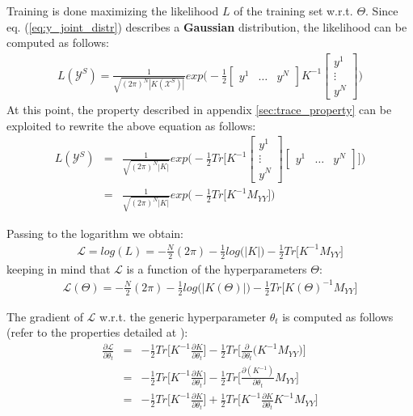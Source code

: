 \documentclass{article}
\begin{document}
Training is done maximizing the likelihood $L$ of the training set w.r.t. $\Theta$.
Since eq. (\ref{eq:y_joint_distr}) describes a \textbf{Gaussian} distribution, the likelihood can be computed as follows:
\begin{eqnarray}
L(\mathcal{Y}^S) = 
\frac{1}{\sqrt{(2 \pi)^N \left | K(\mathcal{X}^S) \right | }}
exp \bigg ( - \frac{1}{2}
\begin{bmatrix} y^1 & \hdots & y^N \end{bmatrix} 
K^{-1}
\begin{bmatrix} y^1 \\ \vdots \\ y^N \end{bmatrix} 
\bigg ) 
\end{eqnarray}
At this point, the property described in appendix \ref{sec:trace_property} can be exploited to rewrite the above equation as follows:
\begin{eqnarray}
L(\mathcal{Y}^S) &=& 
\frac{1}{\sqrt{(2 \pi)^N \left | K \right | }}
exp \bigg ( - \frac{1}{2}
Tr \bigg [ 
K^{-1}
\begin{bmatrix} y^1 \\ \vdots \\ y^N \end{bmatrix} 
\begin{bmatrix} y^1 & \hdots & y^N \end{bmatrix} 
\bigg ]
\bigg ) \\
&=&
\frac{1}{\sqrt{(2 \pi)^N \left | K \right | }}
exp \bigg ( - \frac{1}{2}
Tr \bigg [ 
K^{-1}
M_{YY}
\bigg ]
\bigg )
\end{eqnarray}

Passing to the logarithm we obtain:
\begin{eqnarray}
\mathcal{L} = log(L) = 
-\frac{N}{2}(2 \pi) 
-\frac{1}{2} log \big (\left | K \right | \big )
-\frac{1}{2} Tr \bigg [
K^{-1} M_{YY}
\bigg ] 
\end{eqnarray}
keeping in mind that $\mathcal{L}$ is a function of the hyperparameters $\Theta$:
\begin{eqnarray}
\mathcal{L}(\Theta) = 
-\frac{N}{2}(2 \pi) 
-\frac{1}{2} log \big (\left | K(\Theta) \right | \big )
-\frac{1}{2} Tr \bigg [
K(\Theta)^{-1} M_{YY}
\bigg ] 
\end{eqnarray}

The gradient of $\mathcal{L}$ w.r.t. the generic hyperparameter $\theta_t$ is computed as follows (refer to the properties detailed at \cite{CookBook}):
\begin{eqnarray}
\frac{\partial \mathcal{L}}{\partial \theta_t} &=& 
-\frac{1}{2} Tr \bigg [ K^{-1} \frac{\partial K}{\partial \theta_t} \bigg ]
-\frac{1}{2} Tr \bigg [ \frac{\partial }{\partial \theta_t} \big (  
K^{-1} M_{YY}
\big ) \bigg ] \\
&=& -\frac{1}{2} Tr \bigg [ K^{-1} \frac{\partial K}{\partial \theta_t} \bigg ]
-\frac{1}{2} Tr \bigg [ \frac{\partial (K^{-1}) }{\partial \theta_t} M_{YY} \bigg ] \\
&=& -\frac{1}{2} Tr \bigg [ K^{-1} \frac{\partial K}{\partial \theta_t} \bigg ]
+\frac{1}{2} Tr \bigg [ K^{-1} \frac{\partial K}{\partial \theta_t} K^{-1} M_{YY} \bigg ]
 \label{eq:L_grad}
\end{eqnarray}
\end{document}
